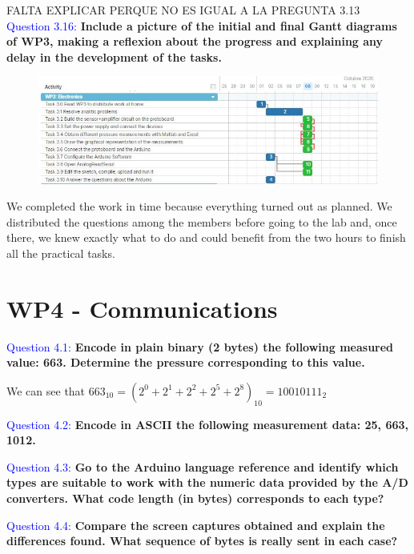\documentclass[12pt, a4papre]{article}
\begin{document}
	FALTA EXPLICAR PERQUE NO ES IGUAL A LA PREGUNTA 3.13\\

	\textcolor{blue}{Question 3.16:} \textbf{Include a picture of the initial and final Gantt diagrams of WP3, making a reflexion about the progress and explaining any delay in the development of the tasks. }
	
	\begin{figure}[H]
		\begin{center}
		\includegraphics[width=150mm]{WP3-8-10-2020.jpg}
		\end{center}
	\end{figure}
	
	We completed the work in time because everything turned out as planned. We distributed the questions among the members before going to the lab and, once there, we knew exactly what to do and could benefit from the two hours to finish all the practical tasks. 
	
	\section{WP4 - Communications}
	
	\textcolor{blue}{Question 4.1:} \textbf{Encode in plain binary (2 bytes) the following measured value: 663. Determine the pressure corresponding to this value.}
	
	We can see that $663_{10} = (2^0 + 2^1 + 2^2 + 2^5 + 2^8)_{10} = 10010111_2$

	\textcolor{blue}{Question 4.2:}  \textbf{Encode in ASCII the following measurement data: 25, 663, 1012.}

	\textcolor{blue}{Question 4.3:} \textbf{Go to the Arduino language reference and identify which types are suitable to work with the numeric data provided by the A/D converters. What code length (in bytes) corresponds to each type?}

	\textcolor{blue}{Question 4.4:} \textbf{Compare the screen captures obtained and explain the differences found. What sequence of bytes is really sent in each case?}
\end{document}
